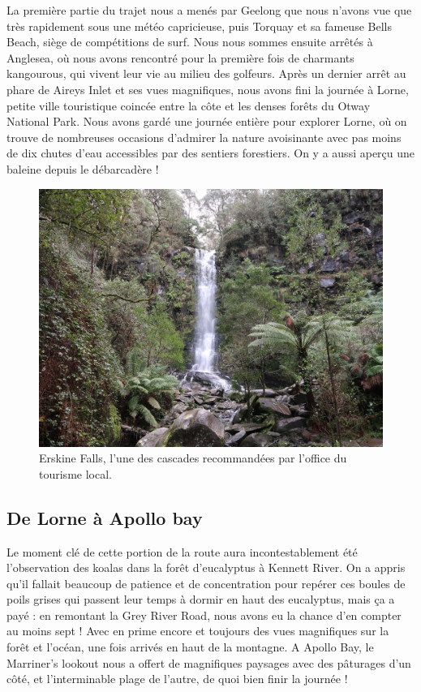 La première partie du trajet nous a menés par Geelong que nous n'avons
vue que très rapidement sous une météo capricieuse, puis Torquay et sa
fameuse Bells Beach, siège de compétitions de surf. Nous nous sommes
ensuite arrêtés à Anglesea, où nous avons rencontré pour la première
fois de charmants kangourous, qui vivent leur vie au milieu des
golfeurs. Après un dernier arrêt au phare de Aireys Inlet et ses vues
magnifiques, nous avons fini la journée à Lorne, petite ville
touristique coincée entre la côte et les denses forêts du Otway National
Park. Nous avons gardé une journée entière pour explorer Lorne, où on
trouve de nombreuses occasions d'admirer la nature avoisinante avec pas
moins de dix chutes d'eau accessibles par des sentiers forestiers. On y
a aussi aperçu une baleine depuis le débarcadère !

\begin{figure}
\centering
\includegraphics{images/20180731_erskinefalls.JPG}
\caption{Erskine Falls, l'une des cascades recommandées par l'office du
tourisme local.}
\end{figure}

\hypertarget{de-lorne-uxe0-apollo-bay}{%
\subsection{De Lorne à Apollo bay}\label{de-lorne-uxe0-apollo-bay}}

Le moment clé de cette portion de la route aura incontestablement été
l'observation des koalas dans la forêt d'eucalyptus à Kennett River. On
a appris qu'il fallait beaucoup de patience et de concentration pour
repérer ces boules de poils grises qui passent leur temps à dormir en
haut des eucalyptus, mais ça a payé : en remontant la Grey River Road,
nous avons eu la chance d'en compter au moins sept ! Avec en prime
encore et toujours des vues magnifiques sur la forêt et l'océan, une
fois arrivés en haut de la montagne. A Apollo Bay, le Marriner's lookout
nous a offert de magnifiques paysages avec des pâturages d'un côté, et
l'interminable plage de l'autre, de quoi bien finir la journée !

